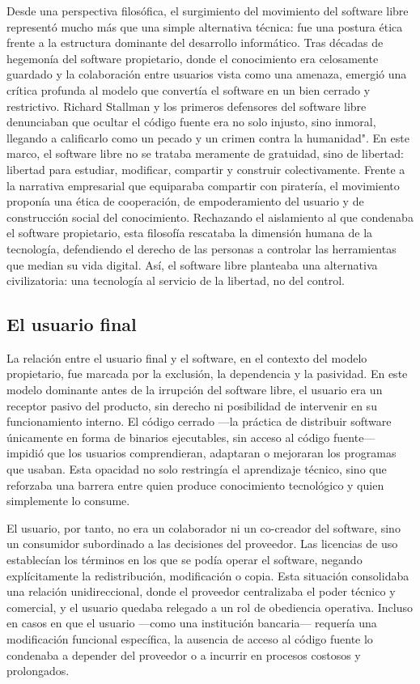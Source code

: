 \documentclass[a4paper,12pt]{article}
\begin{document}
Desde una perspectiva filosófica, el surgimiento del movimiento del software
libre representó mucho más que una simple alternativa técnica: fue una postura
ética frente a la estructura dominante del desarrollo informático. Tras décadas
de hegemonía del software propietario, donde el conocimiento era celosamente
guardado y la colaboración entre usuarios vista como una amenaza, emergió una
crítica profunda al modelo que convertía el software en un bien cerrado y
restrictivo. Richard Stallman y los primeros defensores del software libre
denunciaban que ocultar el código fuente era no solo injusto, sino inmoral,
llegando a calificarlo como un pecado y un crimen contra la humanidad". En este
marco, el software libre no se trataba meramente de gratuidad, sino de libertad:
libertad para estudiar, modificar, compartir y construir colectivamente. Frente
a la narrativa empresarial que equiparaba compartir con piratería, el movimiento
proponía una ética de cooperación, de empoderamiento del usuario y de
construcción social del conocimiento. Rechazando el aislamiento al que condenaba
el software propietario, esta filosofía rescataba la dimensión humana de la
tecnología, defendiendo el derecho de las personas a controlar las herramientas
que median su vida digital. Así, el software libre planteaba una alternativa
civilizatoria: una tecnología al servicio de la libertad, no del control.

\subsection{El usuario final}
La relación entre el usuario final y el software, en el contexto del modelo
propietario, fue marcada por la exclusión, la dependencia y la pasividad. En
este modelo dominante antes de la irrupción del software libre, el usuario era
un receptor pasivo del producto, sin derecho ni posibilidad de intervenir en su
funcionamiento interno. El código cerrado —la práctica de distribuir software
únicamente en forma de binarios ejecutables, sin acceso al código fuente—
impidió que los usuarios comprendieran, adaptaran o mejoraran los programas que
usaban. Esta opacidad no solo restringía el aprendizaje técnico, sino que
reforzaba una barrera entre quien produce conocimiento tecnológico y quien
simplemente lo consume.

El usuario, por tanto, no era un colaborador ni un co-creador del software, sino
un consumidor subordinado a las decisiones del proveedor. Las licencias de uso
establecían los términos en los que se podía operar el software, negando
explícitamente la redistribución, modificación o copia. Esta situación
consolidaba una relación unidireccional, donde el proveedor centralizaba el
poder técnico y comercial, y el usuario quedaba relegado a un rol de obediencia
operativa. Incluso en casos en que el usuario —como una institución bancaria—
requería una modificación funcional específica, la ausencia de acceso al código
fuente lo condenaba a depender del proveedor o a incurrir en procesos costosos y
prolongados.
\end{document}
